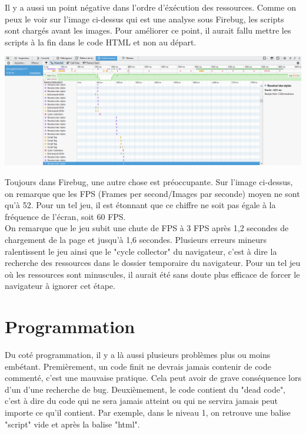 \documentclass{article}
\begin{document}
Il y a aussi un point n\'egative dans l'ordre d'\'ex\'ecution des ressources. Comme on peux le voir sur l'image ci-dessus qui est une analyse sous Firebug, les scripts sont charg\'es avant les images. Pour am\'eliorer ce point, il aurait fallu mettre les scripts \`a la fin dans le code HTML et non au d\'epart. 

\begin{center}
\vspace{0.5cm}
\includegraphics[width=\textwidth]{8}\\
\end{center}

Toujours dans Firebug, une autre chose est pr\'eoccupante. Sur l'image ci-dessus, on remarque que les FPS (Frames per second/Images par seconde) moyen ne sont qu'\`a 52. Pour un tel jeu, il est \'etonnant que ce chiffre ne soit pas \'egale \`a la fr\'equence de l'\'ecran, soit 60 FPS. \\
On remarque que le jeu subit une chute de FPS \`a 3 FPS apr\`es 1,2 secondes de chargement de la page et jusqu'\`a 1,6 secondes. Plusieurs erreurs mineurs ralentissent le jeu ainsi que le "cycle collector" du navigateur, c'est \`a dire la recherche des ressources dans le dossier temporaire du navigateur. Pour un tel jeu o\`u les ressources sont minuscules, il aurait \'et\'e sans doute plus efficace de forcer le navigateur \`a ignorer cet \'etape.

\newpage

\section{Programmation}

\hspace*{0.6cm}Du cot\'e programmation, il y a l\`a aussi plusieurs probl\`emes plus ou moins emb\'etant. Premi\`erement, un code finit ne devrais jamais contenir de code comment\'e, c'est une mauvaise pratique. Cela peut avoir de grave cons\'equence lors d'un d'une recherche de bug. Deuxi\`emement, le code contient du "dead code", c'est \`a dire du code qui ne sera jamais atteint ou qui ne servira jamais peut importe ce qu'il contient. Par exemple, dans le niveau 1, on retrouve une balise "script" vide et apr\`es la balise "html".
\end{document}
